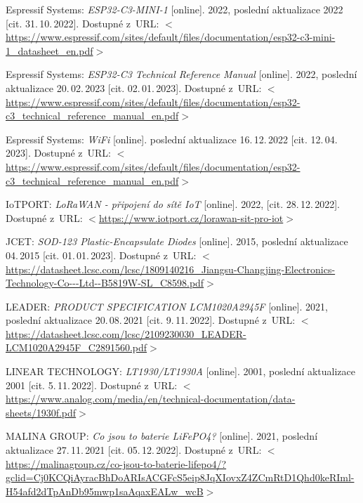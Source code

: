 \begin{thebibliography}{99}
    Espressif Systems:
    \emph{ESP32-C3-MINI-1}\/ [online].
    2022, poslední aktualizace 2022 [cit. 31.\,10.\,2022].
    Dostupné z~URL:
    \(<\)\url{https://www.espressif.com/sites/default/files/documentation/esp32-c3-mini-1_datasheet_en.pdf}\(>\)

    Espressif Systems:
    \emph{ESP32-C3 Technical Reference Manual}\/ [online].
    2022, poslední aktualizace 20.\,02.\,2023 [cit. 02.\,01.\,2023].
    Dostupné z~URL:
    \(<\)\url{https://www.espressif.com/sites/default/files/documentation/esp32-c3_technical_reference_manual_en.pdf}\(>\)

    Espressif Systems:
    \emph{WiFi}\/ [online].
    poslední aktualizace 16.\,12.\,2022 [cit. 12.\,04.\,2023].
    Dostupné z~URL:
    \(<\)\url{https://www.espressif.com/sites/default/files/documentation/esp32-c3_technical_reference_manual_en.pdf}\(>\)


    IoTPORT:
    \emph{LoRaWAN - připojení do sítě IoT}\/ [online].
    2022, [cit. 28.\,12.\,2022].
    Dostupné z~URL:
    \(<\)\url{https://www.iotport.cz/lorawan-sit-pro-iot}\(>\)
 
    JCET:
    \emph{SOD-123 Plastic-Encapsulate Diodes}\/ [online].
    2015, poslední aktualizace 04.\,2015 [cit. 01.\,01.\,2023]. 
    Dostupné z~URL:
    \(<\)\url{https://datasheet.lcsc.com/lcsc/1809140216_Jiangsu-Changjing-Electronics-Technology-Co---Ltd--B5819W-SL_C8598.pdf}\(>\)

    LEADER:
    \emph{PRODUCT SPECIFICATION LCM1020A2945F}\/ [online].
    2021, poslední aktualizace 20.\,08.\,2021 [cit. 9.\,11.\,2022].
    Dostupné z~URL: 
    \(<\)\url{https://datasheet.lcsc.com/lcsc/2109230030_LEADER-LCM1020A2945F_C2891560.pdf}\(>\)

    LINEAR TECHNOLOGY:
    \emph{LT1930/LT1930A}\/ [online].
    2001, poslední aktualizace 2001 [cit. 5.\,11.\,2022].
    Dostupné z~URL: 
    \(<\)\url{https://www.analog.com/media/en/technical-documentation/data-sheets/1930f.pdf}\(>\)

    MALINA GROUP:
    \emph{Co jsou to baterie LiFePO4?}\/ [online].
    2021, poslední aktualizace 27.\,11.\,2021 [cit. 05.\,12.\,2022].
    Dostupné z~URL:
    \(<\)\url{https://malinagroup.cz/co-jsou-to-baterie-lifepo4/?gclid=Cj0KCQiAyracBhDoARIsACGFcS5eip8JqXIovxZ4ZCmRtD1Qhd0keRIml-H54afd2dTpAnDb95mwp1saAqaxEALw_wcB}\(>\)


\end{thebibliography}
